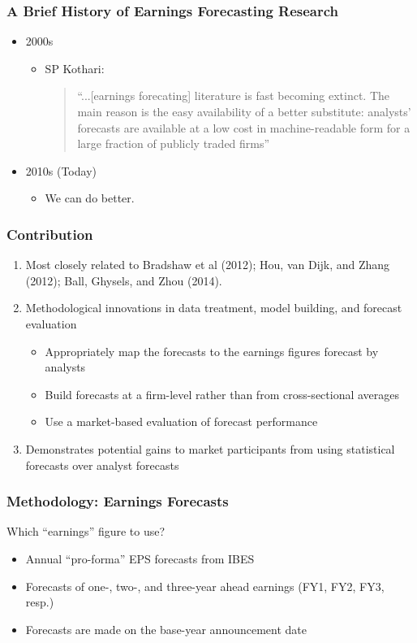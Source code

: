 \documentclass{beamer}
\begin{document}
\begin{frame}
\frametitle{A Brief History of Earnings Forecasting Research}
\begin{itemize}
\item 2000s
\begin{itemize}
\item SP Kothari:\\
\begin{quote}``...[earnings forecating] literature is fast becoming extinct. The main reason is the 
easy availability of a better substitute: analysts' forecasts are available at a low cost in
machine-readable form for a large fraction of publicly traded firms''\end{quote}
\end{itemize}

\item 2010s (Today)
\begin{itemize}
\item We can do better.
\end{itemize}
\end{itemize}
\end{frame}

\begin{frame}
\frametitle{Contribution}
\begin{enumerate}
\item Most closely related to Bradshaw et al (2012); Hou, van Dijk, and Zhang (2012); Ball, Ghysels, and Zhou (2014).
\item Methodological innovations in data treatment, model building, and forecast evaluation
	\begin{itemize}
		\item Appropriately map the forecasts to the earnings figures forecast by analysts
		\item Build forecasts at a firm-level rather than from cross-sectional averages
		\item Use a market-based evaluation of forecast performance
	\end{itemize}
\item Demonstrates potential gains to market participants from using statistical forecasts over analyst forecasts
\end{enumerate}
\end{frame}


\begin{frame}
\frametitle{Methodology: Earnings Forecasts}
Which ``earnings'' figure to use?
\begin{itemize}
\item Annual ``pro-forma'' EPS forecasts from IBES
\item Forecasts of one-, two-, and three-year ahead earnings (FY1, FY2, FY3, resp.)
\item Forecasts are made on the base-year announcement date
\end{itemize}
\end{frame}
\end{document}
